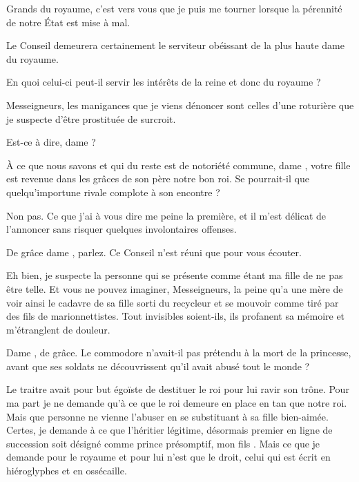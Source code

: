 \scene

\StageDirII{\reine, \nobleOne, \nobleTwo, \nobleTree}


\begin{drama}
  \reinespeaks Grands du royaume, c’est vers vous que je puis me tourner lorsque la pérennité de notre État est mise à mal. 

  \nobleOnespeaks Le Conseil demeurera certainement le serviteur obéissant de la plus haute dame du royaume.

  \nobleTwospeaks En quoi celui-ci peut-il servir les intérêts de la reine et donc du royaume ?

  \reinespeaks Messeigneurs, les manigances que je viens dénoncer sont celles d’une roturière  que je suspecte d’être prostituée de surcroit.

  \nobleOnespeaks Est-ce à dire, dame \reine ?

  \nobleTreespeaks À ce que nous savons et qui du reste est de notoriété commune, dame \princesse, votre fille est revenue dans les grâces de son père notre bon roi. Se pourrait-il que quelqu’importune rivale complote à son encontre ?

  \reinespeaks Non pas. Ce que j’ai à vous dire me peine la première, et il m’est délicat de l’annoncer sans risquer quelques involontaires offenses.

  \nobleOnespeaks De grâce dame \reine, parlez. Ce Conseil n’est réuni que pour vous écouter.

  \reinespeaks Eh bien, je suspecte la personne qui se présente comme étant ma fille \princesse{} de ne pas être telle. Et vous ne pouvez imaginer, Messeigneurs, la peine qu’a une mère de voir ainsi le cadavre de sa fille sorti du recycleur et se mouvoir comme tiré par des fils de marionnettistes. Tout invisibles soient-ils, ils profanent sa mémoire et m’étranglent de douleur. 


  \nobleOnespeaks Dame \reine, de grâce. Le commodore \general{}  n’avait-il pas prétendu à la mort de la princesse, avant que ses soldats ne découvrissent qu’il avait abusé tout le monde ?

  \reinespeaks Le traitre avait pour but égoïste de destituer le roi pour lui ravir son trône. Pour ma part je ne demande qu’à ce que le roi demeure en place en tan que notre roi. Mais que personne ne vienne l’abuser en se substituant à sa fille bien-aimée. Certes, je demande à ce que l’héritier légitime, désormais premier en ligne de succession soit désigné comme prince présomptif, mon fils \vladimir{}. Mais ce que je demande pour le royaume et pour lui n’est que le droit, celui qui est écrit en hiéroglyphes et en ossécaille.


\end{drama}
